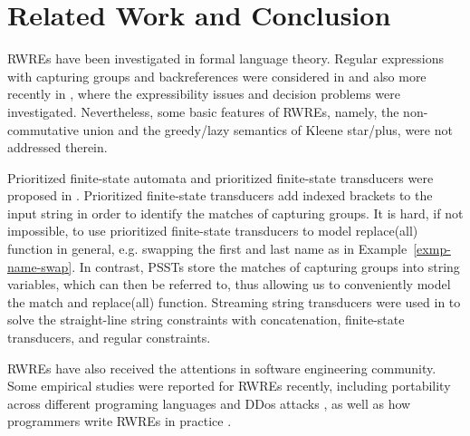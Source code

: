 
\section{Related Work and Conclusion}

RWREs have been investigated in formal language theory. Regular expressions with capturing groups and backreferences were considered in \cite{CSY03,CN09} and also more recently in \cite{Freydenberger13,Schmid16,FS19}, where the expressibility issues and decision problems were investigated. Nevertheless, some basic features of RWREs, namely, the non-commutative union and the greedy/lazy semantics of Kleene star/plus, were not addressed therein.

Prioritized finite-state automata and prioritized finite-state transducers were proposed in \cite{BM17}. Prioritized finite-state transducers add indexed brackets to the input string in order to identify the matches of capturing groups. It is hard, if not impossible, to use prioritized finite-state transducers to model replace(all) function in general, e.g. swapping the first and last name as in Example~\ref{exmp-name-swap}. In contrast, PSSTs store the matches of capturing groups into string variables, which can then be referred to, thus allowing us to conveniently model the match and replace(all) function. 
%
Streaming string transducers were used in \cite{ZAM19} to solve the straight-line string constraints with concatenation, finite-state transducers, and regular constraints.

RWREs have also received the attentions in software engineering community. Some empirical studies were reported for RWREs recently, including portability across different programing languages \cite{DMC+19} and DDos attacks \cite{SP18}, as well as how programmers write RWREs in practice \cite{MDD+19}.


